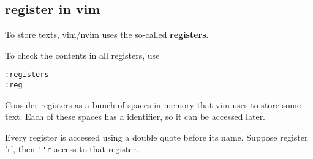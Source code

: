 \subsection{register in vim}
\label{sec:register-vim-nvim}


To store texts, vim/nvim uses the so-called {\bf registers}.

To check the contents in all registers, use
\begin{verbatim}
:registers
:reg
\end{verbatim}

Consider registers as a bunch of spaces in memory that vim uses to store some
text. Each of these spaces has a identifier, so it can be accessed later.


Every register is accessed using a double quote before its name. Suppose
register 'r', then \verb!''r! access to that register.

